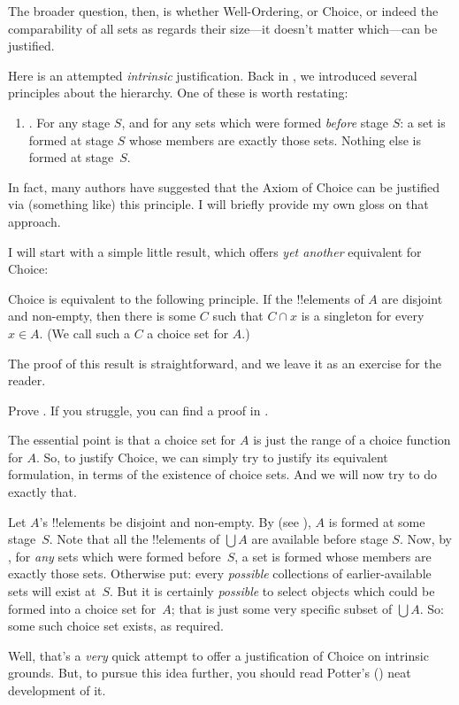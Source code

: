 \documentclass[../../../include/open-logic-section]{subfiles}
\begin{document}

The broader question, then, is whether Well-Ordering, or Choice, or
indeed the comparability of all sets as regards their size---it
doesn't matter which---can be justified. 

Here is an attempted \emph{intrinsic} justification. Back in
, we introduced several principles
about the hierarchy. One of these is worth restating:
\begin{enumerate}
	\item[] \stagesacc. For any stage $S$, and for any sets which were
	formed \emph{before} stage $S$: a set is formed at stage $S$ whose
	members are exactly those sets. Nothing else is formed at
	stage~$S$. 
\end{enumerate}
In fact, many authors have suggested that the Axiom of Choice can be
justified via (something like) this principle. I will briefly provide
my own gloss on that approach.

I will start with a simple little result, which offers \emph{yet
another} equivalent for Choice:

\begin{thm}[in $\ZF$]
Choice is equivalent to the following principle. If the !!{element}s
of $A$ are disjoint and non-empty, then there is some $C$ such that $C
\cap x$ is a singleton for every $x \in A$. (We call such a $C$ a
{choice set} for $A$.)
\end{thm}

The proof of this result is straightforward, and we leave it as an
exercise for the reader. 

\begin{prob}
Prove . If you struggle,
you can find a proof in \cite[pp.~242--3]{Potter2004}.
\end{prob}

The essential point is that a choice set for $A$ is just the range of
a choice function for $A$. So, to justify Choice, we can simply try to
justify its equivalent formulation, in terms of the existence of
choice sets. And we will now try to do exactly that. 

Let $A$'s !!{element}s be disjoint and non-empty. By \stageshier{}
(see ), $A$ is formed at some stage~$S$. Note
that all the !!{element}s of $\bigcup A$ are available before stage
$S$. Now, by \stagesacc{}, for \emph{any} sets which were formed
before~$S$, a set is formed whose members are exactly those sets.
Otherwise put: every \emph{possible} collections of earlier-available
sets will exist at~$S$. But it is certainly \emph{possible} to select
objects which could be formed into a choice set for~$A$; that is just
some very specific subset of $\bigcup A$. So: some such choice set
exists, as required.

Well, that's a \emph{very} quick attempt to offer a justification of
Choice on intrinsic grounds. But, to pursue this idea further, you
should read Potter's (\citeyear[\S14.8]{Potter2004}) neat development
of it.
\end{document}
